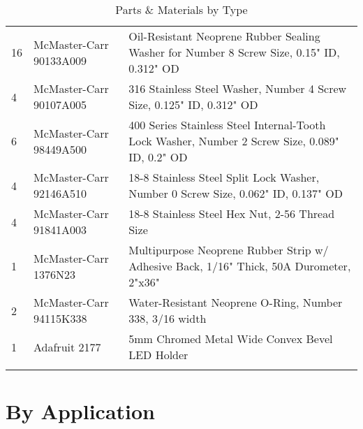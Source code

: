 \begin{longtabu}{X[1,c,m] X[6,c,m] X[9,l,m]}
  16 & McMaster-Carr 90133A009 & Oil-Resistant Neoprene Rubber Sealing Washer for Number 8 Screw Size, 0.15" ID, 0.312" OD \\
  4 & McMaster-Carr 90107A005 & 316 Stainless Steel Washer, Number 4 Screw Size, 0.125" ID, 0.312" OD \\
  6 & McMaster-Carr 98449A500 & 400 Series Stainless Steel Internal-Tooth Lock Washer, Number 2 Screw Size, 0.089" ID, 0.2" OD \\
  4 & McMaster-Carr 92146A510 & 18-8 Stainless Steel Split Lock Washer, Number 0 Screw Size, 0.062" ID, 0.137" OD \\

  4 & McMaster-Carr 91841A003 & 18-8 Stainless Steel Hex Nut, 2-56 Thread Size \\

  1 & McMaster-Carr 1376N23 & Multipurpose Neoprene Rubber Strip w/ Adhesive Back, 1/16" Thick, 50A Durometer, 2"x36" \\
  2 & McMaster-Carr 94115K338 & Water-Resistant Neoprene O-Ring, Number 338, 3/16 width \\
  1 & Adafruit 2177 & 5mm Chromed Metal Wide Convex Bevel LED Holder \\

  \bhrule
\caption{Parts \& Materials by Type}
\end{longtabu}

\pagebreak
\section{By Application}

